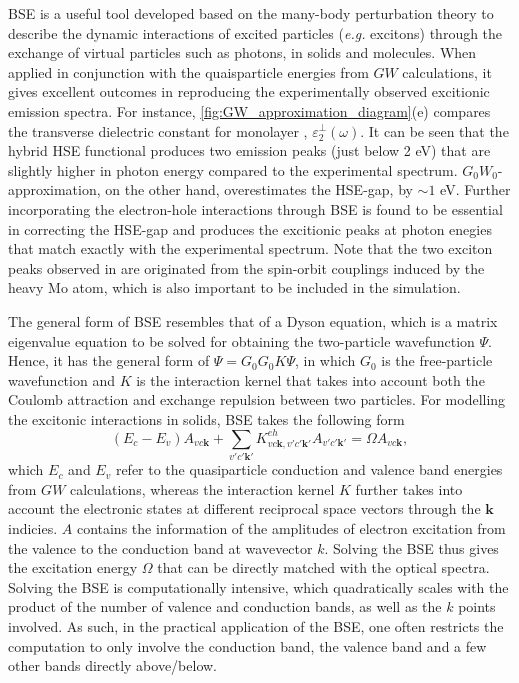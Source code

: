 

BSE\cite{salpeter1951relativistic} is a useful tool developed based on the many-body perturbation theory to describe the dynamic interactions of excited particles (\emph{e.g.} excitons) through the exchange of virtual particles such as photons, in solids and molecules. When applied in conjunction with the quaisparticle energies from $GW$ calculations, it gives excellent outcomes in reproducing the experimentally observed excitionic emission spectra. For instance, \cref{fig:GW_approximation_diagram}(e) compares the transverse dielectric constant for monolayer , $\varepsilon_{2}^{\perp}(\omega)$.\cite{ramasubramaniam2012large} It can be seen that the hybrid HSE functional produces two emission peaks (just below 2 eV) that are slightly higher in photon energy compared to the experimental spectrum. $G_{0}W_{0}$-approximation, on the other hand, overestimates the HSE-gap, by $\sim 1$ eV. Further incorporating the electron-hole interactions  through BSE is found to be essential in correcting the HSE-gap and produces the excitionic peaks at photon enegies that match exactly with the experimental spectrum. Note that the two exciton peaks observed in   are originated from the spin-orbit couplings induced by the heavy Mo atom, which is also important to be included in the simulation. 

The general form of BSE resembles that of a Dyson equation, which is a matrix eigenvalue equation to be solved for obtaining the two-particle wavefunction $\Psi$. Hence, it has the general form of $\Psi=G_0 G_0 K\Psi$, in which $G_0$ is the free-particle wavefunction and $K$ is the interaction kernel that takes into account both the Coulomb attraction and exchange repulsion between two particles. For modelling the excitonic interactions in solids, BSE takes the following form
\begin{equation}
    \label{eq:BSE}
    \left( E_c - E_v \right) A_{vc\bm{k}} + \sum_{v'c'\bm{k}'} K^{eh}_{vc\bm{k},v'c'\bm{k}'} A_{v'c'\bm{k}'} = \Omega A_{vc\bm{k}},
\end{equation}
which $E_{c}$ and $E_{v}$ refer to the quasiparticle conduction and valence band energies from $GW$ calculations, whereas the interaction kernel $K$ further takes into account the electronic states at different reciprocal space vectors through the $\bm{k}$ indicies. $A$ contains the information of the  amplitudes of electron excitation from the valence to the conduction band at wavevector $k$. Solving the BSE thus gives the excitation energy $\Omega$ that can be directly matched with the optical spectra. Solving the BSE is computationally intensive, which quadratically scales with the product of  the number of valence and conduction bands, as well as the $k$ points involved. As such, in the practical application of the BSE, one often restricts the computation to only involve  the conduction band, the valence band and a few other bands directly above/below.


